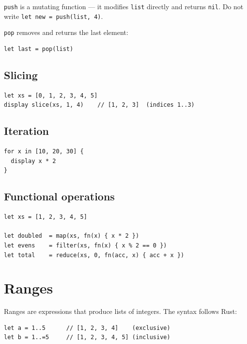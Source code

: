 \begin{aviso}
  \lstinline{push} is a mutating function — it modifies \lstinline{list}
  directly and returns \lstinline{nil}. Do not write
  \lstinline{let new = push(list, 4)}.
\end{aviso}

\lstinline{pop} removes and returns the last element:

\begin{lstlisting}
let last = pop(list)
\end{lstlisting}

\subsection{Slicing}

\begin{lstlisting}
let xs = [0, 1, 2, 3, 4, 5]
display slice(xs, 1, 4)    // [1, 2, 3]  (indices 1..3)
\end{lstlisting}

\subsection{Iteration}

\begin{lstlisting}
for x in [10, 20, 30] {
  display x * 2
}
\end{lstlisting}

\subsection{Functional operations}

\begin{lstlisting}
let xs = [1, 2, 3, 4, 5]

let doubled  = map(xs, fn(x) { x * 2 })
let evens    = filter(xs, fn(x) { x % 2 == 0 })
let total    = reduce(xs, 0, fn(acc, x) { acc + x })
\end{lstlisting}

\section{Ranges}
\label{sec:ranges}

Ranges are expressions that produce lists of integers. The syntax follows
Rust:

\begin{lstlisting}[caption={Ranges as lists}]
let a = 1..5      // [1, 2, 3, 4]    (exclusive)
let b = 1..=5     // [1, 2, 3, 4, 5] (inclusive)
\end{lstlisting}

